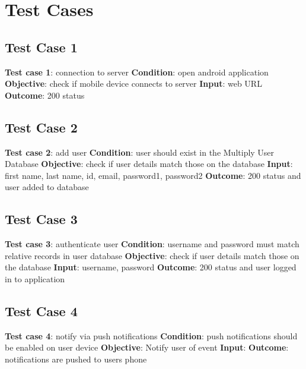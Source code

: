 \documentclass[11pt]{article}
\begin{document}
\section{Test Cases}
\subsection{Test Case 1}
\textbf{Test case 1}: connection to server \newline
\textbf{Condition}: open android application \newline
\textbf{Objective}: check if mobile device connects to server  \newline
\textbf{Input}: web URL \newline
\textbf{Outcome}:  200 status \newline

\subsection{Test Case 2}
\textbf{Test case 2}: add user \newline
\textbf{Condition}:  user should exist in the Multiply User Database \newline
\textbf{Objective}: check if user details match those on the database\newline
\textbf{Input}: first name, last name, id, email, password1, password2 \newline
\textbf{Outcome}: 200 status and user added to database \newline

\subsection{Test Case 3}
\textbf{Test case 3}: authenticate user \newline
\textbf{Condition}:  username and password must match relative records in user database\newline
\textbf{Objective}: check if user details match those on the database  \newline
\textbf{Input}:  username, password\newline
\textbf{Outcome}:  200 status and user logged in to application \newline

\subsection{Test Case 4}
\textbf{Test case 4}:  notify via push notifications\newline
\textbf{Condition}:  push notifications should be enabled on user device\newline
\textbf{Objective}:  Notify user of event \newline
\textbf{Input}:  \newline
\textbf{Outcome}:  notifications are pushed to users phone \newline
\end{document}
